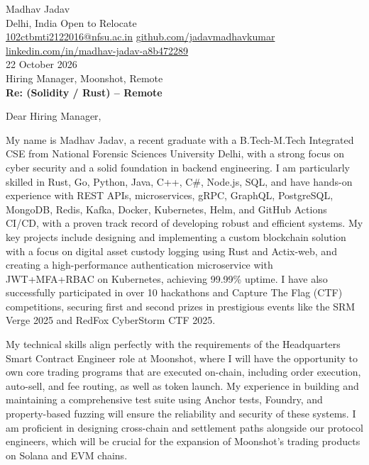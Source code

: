 \documentclass[10pt,letterpaper]{article}
\begin{document}
\begin{flushleft}
Madhav Jadav\\
Delhi, India \textbar{} Open to Relocate\\
\href{mailto:102ctbmti2122016@nfsu.ac.in}{102ctbmti2122016@nfsu.ac.in} \textbar{} \href{https://github.com/jadavmadhavkumar}{github.com/jadavmadhavkumar} \textbar{} \href{https://www.linkedin.com/in/madhav-jadav-a8b472289}{linkedin.com/in/madhav-jadav-a8b472289}\\[8pt]
22 October 2026\\[4pt]
Hiring Manager, Moonshot, Remote\\[8pt]
\textbf{Re: (Solidity / Rust) – Remote}\\[8pt]
\end{flushleft}
Dear Hiring Manager,

My name is Madhav Jadav, a recent graduate with a B.Tech-M.Tech Integrated CSE from National Forensic Sciences University Delhi, with a strong focus on cyber security and a solid foundation in backend engineering. I am particularly skilled in Rust, Go, Python, Java, C++, C\#, Node.js, SQL, and have hands-on experience with REST APIs, microservices, gRPC, GraphQL, PostgreSQL, MongoDB, Redis, Kafka, Docker, Kubernetes, Helm, and GitHub Actions CI/CD, with a proven track record of developing robust and efficient systems. My key projects include designing and implementing a custom blockchain solution with a focus on digital asset custody logging using Rust and Actix-web, and creating a high-performance authentication microservice with JWT+MFA+RBAC on Kubernetes, achieving 99.99\% uptime. I have also successfully participated in over 10 hackathons and Capture The Flag (CTF) competitions, securing first and second prizes in prestigious events like the SRM Verge 2025 and RedFox CyberStorm CTF 2025.

My technical skills align perfectly with the requirements of the Headquarters Smart Contract Engineer role at Moonshot, where I will have the opportunity to own core trading programs that are executed on-chain, including order execution, auto-sell, and fee routing, as well as token launch. My experience in building and maintaining a comprehensive test suite using Anchor tests, Foundry, and property-based fuzzing will ensure the reliability and security of these systems. I am proficient in designing cross-chain and settlement paths alongside our protocol engineers, which will be crucial for the expansion of Moonshot's trading products on Solana and EVM chains.
\end{document}
